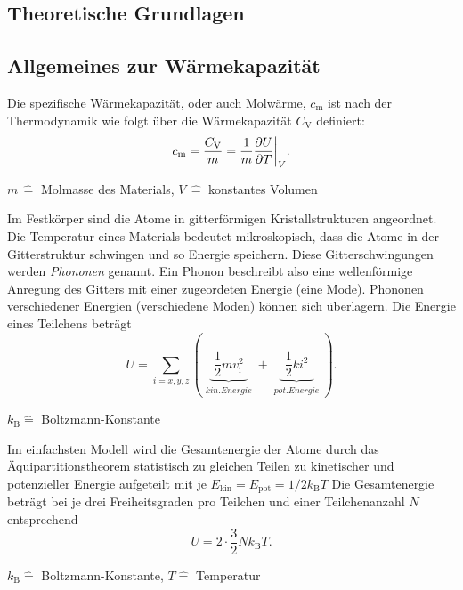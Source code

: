 \subsection{Theoretische Grundlagen}
\subsection{Allgemeines zur Wärmekapazität}
Die spezifische Wärmekapazität, oder auch Molwärme, $c_{\text{m}}$ ist nach der Thermodynamik wie folgt über die Wärmekapazität $C_{\text{V}}$ definiert:
\begin{equation*}
	c_{\text{m}} = \frac{C_{\text{V}}}{m} = \frac{1}{m} \frac{\partial U}{\partial T} \bigg{\vert}_{V}.
\end{equation*}
\begin{center}
	\tiny{$m \, \widehat{=}$ Molmasse des Materials, $V \, \widehat{=}$ konstantes Volumen }
\end{center}
Im Festkörper sind die Atome in gitterförmigen Kristallstrukturen angeordnet.
Die Temperatur eines Materials bedeutet mikroskopisch, dass die Atome in der Gitterstruktur schwingen und so Energie speichern.
Diese Gitterschwingungen werden \textit{Phononen} genannt.
Ein Phonon beschreibt also eine wellenförmige Anregung des Gitters mit einer zugeordeten Energie (eine Mode).
Phononen verschiedener Energien (verschiedene Moden) können sich überlagern.
Die Energie eines Teilchens beträgt
\begin{equation*}
	U = \sum_{i=x,y,z} \left( \underbrace{ \,\, \frac{1}{2}mv_{\text{i}}^2 \,\, }_{\substack{kin. Energie}} + \underbrace{ \,\, \frac{1}{2} k i^2 \,\, }_{\substack{pot. Energie}} \right).
\end{equation*}
\begin{center}
	\tiny{$k_{\text{B}} \widehat{=}$ Boltzmann-Konstante }
\end{center}
Im einfachsten Modell wird die Gesamtenergie der Atome durch das Äquipartitionstheorem statistisch zu gleichen Teilen zu kinetischer und potenzieller Energie aufgeteilt mit je $E_{\text{kin}} = E_{\text{pot}} = 1/2 k_{\text{B}} T $
Die Gesamtenergie beträgt bei je drei Freiheitsgraden pro Teilchen und einer Teilchenanzahl $N$ entsprechend
\begin{equation*}
	U = 2 \cdot \frac{3}{2} N k_{\text{B}} T.
\end{equation*}
\begin{center}
	\tiny{$k_{\text{B}} \widehat{=}$ Boltzmann-Konstante, $T \widehat{=}$ Temperatur}
\end{center}
